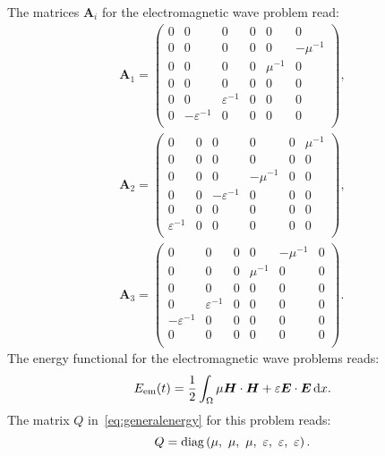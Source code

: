 \documentclass[a4paper]{article}
\renewcommand{\vec}{\boldsymbol}
\begin{document}
The matrices $\vec{A}_{i}$ for the electromagnetic wave problem read:
\begin{multline}
  \vec{A}_1
  =
  \begin{pmatrix}
    0 & 0 & 0 & 0 & 0 & 0 \\
    0 & 0 & 0 & 0 & 0 & -\mu^{-1}\\
    0 & 0 & 0 & 0 & \mu^{-1} & 0\\
    0 & 0 & 0 & 0 & 0 & 0 \\
    0 & 0 & \varepsilon^{-1} & 0 & 0 & 0 \\
    0 & -\varepsilon^{-1} & 0 & 0 & 0 & 0 \\
  \end{pmatrix},
  \\
  \vec{A}_2
  =
  \begin{pmatrix}
    0 & 0 & 0 & 0 & 0 & \mu^{-1} \\
    0 & 0 & 0 & 0 & 0 & 0\\
    0 & 0 & 0 & -\mu^{-1} & 0 & 0\\
    0 & 0 & -\varepsilon^{-1} & 0 & 0 & 0 \\
    0 & 0 & 0 & 0 & 0 & 0 \\
    \varepsilon^{-1} & 0 & 0 & 0 & 0 & 0 \\
  \end{pmatrix},
  \\
  \vec{A}_3
  =
  \begin{pmatrix}
    0 & 0 & 0 & 0 & -\mu^{-1} & 0 \\
    0 & 0 & 0 & \mu^{-1} & 0 & 0\\
    0 & 0 & 0 & 0 & 0 & 0\\
    0 & \varepsilon^{-1} & 0 & 0 & 0 & 0 \\
    -\varepsilon^{-1} & 0 & 0 & 0 & 0 & 0 \\
    0 & 0 & 0 & 0 & 0 & 0 \\
  \end{pmatrix}.
  \label{eq:Aelectro}
\end{multline}
The energy functional for the electromagnetic wave problems reads:
\begin{equation}
  E_\text{em}(t) = \frac{1}{2}\int_{\Omega} \mu \vec{H} \cdot \vec{H} +
  \varepsilon \vec{E} \cdot \vec{E} \dif x.
  \label{eq:electromagneticenegery}
\end{equation}
The matrix $Q$ in~\eqref{eq:generalenergy} for this problem reads:
\begin{equation}
  Q = \text{diag}\del{\mu, \ \mu, \ \mu, \ \varepsilon,  \
    \varepsilon, \ \varepsilon}.
  \label{eq:Qelectro}
\end{equation}
\end{document}
